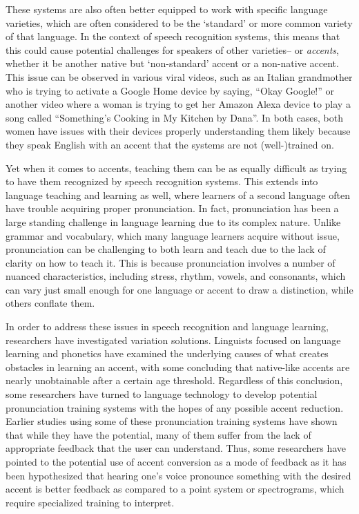 \documentclass
[
    a4paper,
    twoside,
    12pt,
]
{report}
\begin{document}
These systems are also often better equipped to work with specific
language varieties, which are often considered to be the `standard' or
more common variety of that language. In the context of speech
recognition systems, this means that this could cause potential
challenges for speakers of other varieties-- or \emph{accents}, whether
it be another native but `non-standard' accent or a non-native accent.
This issue can be observed in various viral videos, such as an Italian
grandmother who is trying to activate a Google Home device by saying,
``Okay Google!'' or another video where a woman is trying to get her
Amazon Alexa device to play a song called ``Something's Cooking in My
Kitchen by Dana''. In both cases, both women have issues with their
devices properly understanding them likely because they speak English
with an accent that the systems are not (well-)trained on.

Yet when it comes to accents, teaching them can be as equally difficult
as trying to have them recognized by speech recognition systems. This
extends into language teaching and learning as well, where learners of a
second language often have trouble acquiring proper pronunciation. In
fact, pronunciation has been a large standing challenge in language
learning due to its complex nature. Unlike grammar and vocabulary, which
many language learners acquire without issue, pronunciation can be
challenging to both learn and teach due to the lack of clarity on how to
teach it. This is because pronunciation involves a number of nuanced
characteristics, including stress, rhythm, vowels, and consonants, which
can vary just small enough for one language or accent to draw a
distinction, while others conflate them.

In order to address these issues in speech recognition and language
learning, researchers have investigated variation solutions. Linguists
focused on language learning and phonetics have examined the underlying
causes of what creates obstacles in learning an accent, with some
concluding that native-like accents are nearly unobtainable after a
certain age threshold. Regardless of this conclusion, some researchers
have turned to language technology to develop potential pronunciation
training systems with the hopes of any possible accent reduction.
Earlier studies using some of these pronunciation training systems have
shown that while they have the potential, many of them suffer from the
lack of appropriate feedback that the user can understand. Thus, some
researchers have pointed to the potential use of accent conversion as a
mode of feedback as it has been hypothesized that hearing one's voice
pronounce something with the desired accent is better feedback as
compared to a point system or spectrograms, which require specialized
training to interpret.
\end{document}
